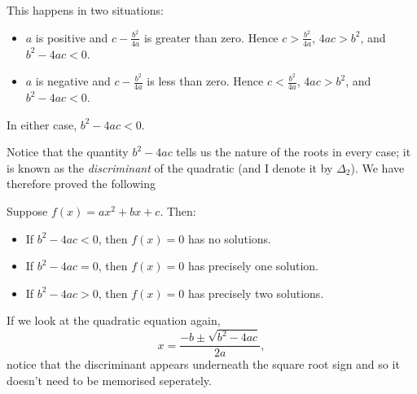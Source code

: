 This happens in two situations:
\begin{itemize}
  \item $ a $ is positive and $ c - \frac{b^2}{4a} $ is greater than zero. Hence $ c > \frac{b^2}{4a} $, $ 4ac > b^2 $, and $ b^2 - 4ac < 0 $.
  \item $ a $ is negative and $ c - \frac{b^2}{4a} $ is less than zero. Hence $ c < \frac{b^2}{4a} $, $ 4ac > b^2 $, and $ b^2 - 4ac < 0 $.
\end{itemize}

In either case, $ b^2 - 4ac < 0 $.

Notice that the quantity $ b^2 - 4ac $ tells us the nature of the roots in every case; it is known as the \emph{discriminant} of
the quadratic (and I denote it by $ \Delta_2 $). We have therefore proved the following
\begin{thm}
  Suppose $ f(x) = ax^2 + bx + c $. Then:
  \begin{itemize}
    \item If $ b^2 - 4ac < 0 $, then $ f(x) = 0 $ has no solutions.
    \item If $ b^2 - 4ac = 0 $, then $ f(x) = 0 $ has precisely one solution.
    \item If $ b^2 - 4ac > 0 $, then $ f(x) = 0 $ has precisely two solutions.
  \end{itemize}
\end{thm}

If we look at the quadratic equation again,
\begin{displaymath}
  x = \frac{-b \pm \sqrt{b^2 - 4ac}}{2a},
\end{displaymath}
notice that the discriminant appears underneath the square root sign and so it doesn't need to be memorised seperately.

\clearpage
